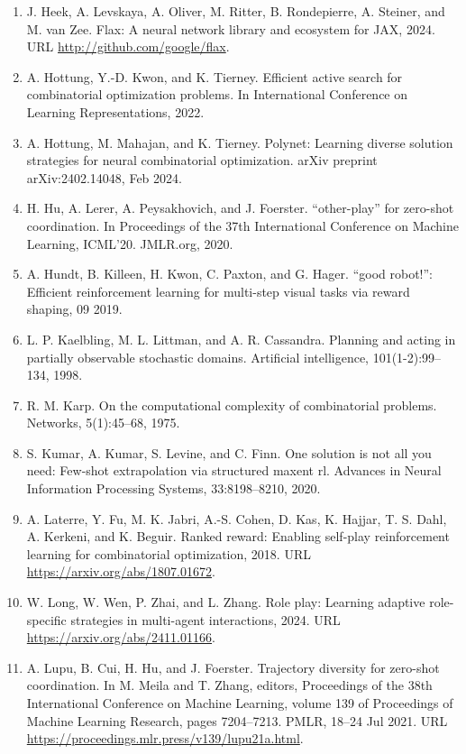 \documentclass[11pt,UTF8,fontset=fandol]{ctexart}
\begin{document}
\begin{enumerate}[leftmargin=2em,itemsep=2pt]
\item J. Heek, A. Levskaya, A. Oliver, M. Ritter, B. Rondepierre, A. Steiner, and M. van Zee. Flax: A neural network library and ecosystem for JAX, 2024. URL \url{http://github.com/google/flax}.
\item A. Hottung, Y.-D. Kwon, and K. Tierney. Efficient active search for combinatorial optimization problems. In International Conference on Learning Representations, 2022.
\item A. Hottung, M. Mahajan, and K. Tierney. Polynet: Learning diverse solution strategies for neural combinatorial optimization. arXiv preprint arXiv:2402.14048, Feb 2024.
\item H. Hu, A. Lerer, A. Peysakhovich, and J. Foerster. ``other-play'' for zero-shot coordination. In Proceedings of the 37th International Conference on Machine Learning, ICML'20. JMLR.org, 2020.
\item A. Hundt, B. Killeen, H. Kwon, C. Paxton, and G. Hager. ``good robot!'': Efficient reinforcement learning for multi-step visual tasks via reward shaping, 09 2019.
\item L. P. Kaelbling, M. L. Littman, and A. R. Cassandra. Planning and acting in partially observable stochastic domains. Artificial intelligence, 101(1-2):99--134, 1998.
\item R. M. Karp. On the computational complexity of combinatorial problems. Networks, 5(1):45--68, 1975.
\item S. Kumar, A. Kumar, S. Levine, and C. Finn. One solution is not all you need: Few-shot extrapolation via structured maxent rl. Advances in Neural Information Processing Systems, 33:8198--8210, 2020.
\item A. Laterre, Y. Fu, M. K. Jabri, A.-S. Cohen, D. Kas, K. Hajjar, T. S. Dahl, A. Kerkeni, and K. Beguir. Ranked reward: Enabling self-play reinforcement learning for combinatorial optimization, 2018. URL \url{https://arxiv.org/abs/1807.01672}.
\item W. Long, W. Wen, P. Zhai, and L. Zhang. Role play: Learning adaptive role-specific strategies in multi-agent interactions, 2024. URL \url{https://arxiv.org/abs/2411.01166}.
\item A. Lupu, B. Cui, H. Hu, and J. Foerster. Trajectory diversity for zero-shot coordination. In M. Meila and T. Zhang, editors, Proceedings of the 38th International Conference on Machine Learning, volume 139 of Proceedings of Machine Learning Research, pages 7204--7213. PMLR, 18--24 Jul 2021. URL \url{https://proceedings.mlr.press/v139/lupu21a.html}.

\end{enumerate}
\end{document}
